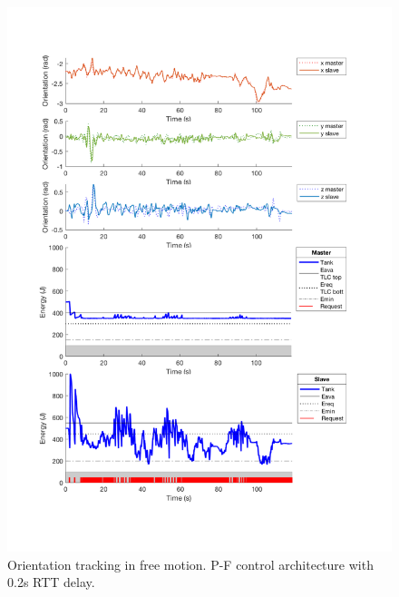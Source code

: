 \begin{center}
	\begin{figure}
		\includegraphics[width=\textwidth, keepaspectratio]{plots/pfFreeDelay/Orientation.pdf}
		\caption{Orientation tracking in free motion. P-F control architecture with 0.2s RTT delay.}
		\label{graph:pfFreeDelay/Orientation}
	\end{figure}
\end{center}
